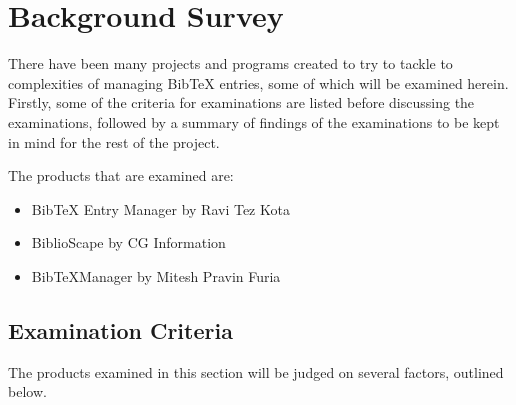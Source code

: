 \documentclass{l4proj}
\newcommand{\BibTeX}{B{\sc ib}\TeX}
\newcommand{\bibtex}{\BibTeX}
\begin{document}

\chapter{Background Survey}
\label{backgrnd}
There have been many projects and programs created to try to tackle to complexities of managing \bibtex{} entries, some of which will be examined herein.  Firstly, some of the criteria for examinations are listed before discussing the examinations, followed by a summary of findings of the examinations to be kept in mind for the rest of the project.

The products that are examined are:
\begin{itemize}
	\item \bibtex{} Entry Manager by Ravi Tez Kota
	\item BiblioScape by CG Information
	\item \bibtex Manager by Mitesh Pravin Furia 
\end{itemize}

\section{Examination Criteria}
The products examined in this section will be judged on several factors, outlined below.
\end{document}
